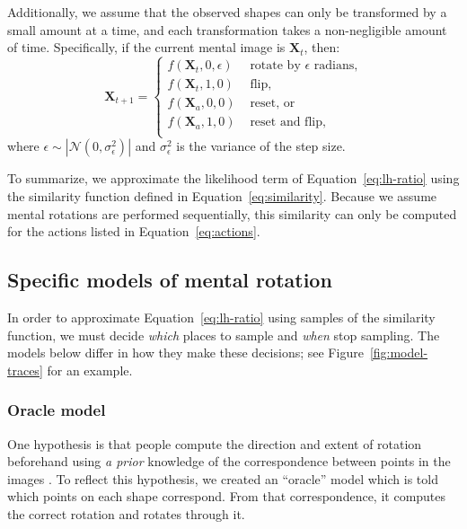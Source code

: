 \documentclass[10pt,letterpaper]{article}
\newcommand{\Xa}[0]{\mathbf{X}_a}
\newcommand{\Xt}[0]{\mathbf{X}_t}
\begin{document}
Additionally, we assume that the observed shapes can only be
transformed by a small amount at a time, and each transformation takes
a non-negligible amount of time. Specifically, if the current mental
image is $\Xt$, then:
\begin{equation}
  \mathbf{X}_{t+1} = \left\{ \begin{array}{ll}
      f(\Xt, 0, \epsilon) &\mbox{ rotate by $\epsilon$ radians,} \\
      f(\Xt, 1, 0) &\mbox{ flip,} \\
      f(\Xa, 0, 0) &\mbox{ reset, or} \\
      f(\Xa, 1, 0) &\mbox{ reset and flip,} \\
    \end{array} \right.
  \label{eq:actions}
\end{equation}
where $\epsilon\sim \left|\mathcal{N}(0, \sigma_\epsilon^2)\right|$
and $\sigma_\epsilon^2$ is the variance of the step size.

To summarize, we approximate the likelihood term of
Equation~\ref{eq:lh-ratio} using the similarity function defined in
Equation~\ref{eq:similarity}. Because we assume mental rotations are
performed sequentially, this similarity can only be computed for the
actions listed in Equation~\ref{eq:actions}.

\subsection{Specific models of mental rotation}

In order to approximate Equation~\ref{eq:lh-ratio} using samples of
the similarity function, we must decide \textit{which} places to
sample and \textit{when} stop sampling. The models below differ in how
they make these decisions; see Figure~\ref{fig:model-traces} for an
example.

\subsubsection{Oracle model}

One hypothesis is that people compute the direction and extent of
rotation beforehand using \textit{a prior} knowledge of the
correspondence between points in the images
\cite{Funt:1983wn,Just:1985uu}.  To reflect this hypothesis, we
created an ``oracle'' model which is told which points on each shape
correspond. From that correspondence, it computes the correct rotation
and rotates through it.
\end{document}
